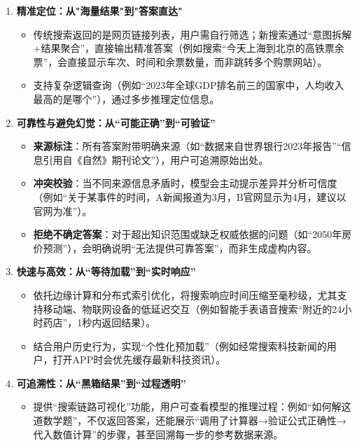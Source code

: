 \begin{enumerate}
    \item \textbf{精准定位：从"海量结果"到"答案直达"}  
    \begin{itemize}
        \item 传统搜索返回的是网页链接列表，用户需自行筛选；新搜索通过“意图拆解+结果聚合”，直接输出精准答案（例如搜索“今天上海到北京的高铁票余票”，会直接显示车次、时间和余票数量，而非跳转多个购票网站）。  
        \item 支持复杂逻辑查询（例如“2023年全球GDP排名前三的国家中，人均收入最高的是哪个”），通过多步推理定位信息。  
    \end{itemize}

    \item \textbf{可靠性与避免幻觉：从“可能正确”到“可验证”}  
    \begin{itemize}
        \item \textbf{来源标注}：所有答案附带明确来源（如“数据来自世界银行2023年报告”“信息引用自《自然》期刊论文”），用户可追溯原始出处。  
        \item \textbf{冲突校验}：当不同来源信息矛盾时，模型会主动提示差异并分析可信度（例如“关于某事件的时间，A新闻报道为3月，B官网显示为4月，建议以官网为准”）。  
        \item \textbf{拒绝不确定答案}：对于超出知识范围或缺乏权威依据的问题（如“2050年房价预测”），会明确说明“无法提供可靠答案”，而非生成虚构内容。  
    \end{itemize}

    \item \textbf{快速与高效：从“等待加载”到“实时响应”}  
    \begin{itemize}
        \item 依托边缘计算和分布式索引优化，将搜索响应时间压缩至毫秒级，尤其支持移动端、物联网设备的低延迟交互（例如智能手表语音搜索“附近的24小时药店”，1秒内返回结果）。  
        \item 结合用户历史行为，实现“个性化预加载”（例如经常搜索科技新闻的用户，打开APP时会优先缓存最新科技资讯）。  
    \end{itemize}

    \item \textbf{可追溯性：从“黑箱结果”到“过程透明”}  
    \begin{itemize}
        \item 提供“搜索链路可视化”功能，用户可查看模型的推理过程：例如“如何解这道数学题”，不仅返回答案，还能展示“调用了计算器→验证公式正确性→代入数值计算”的步骤，甚至回溯每一步的参考数据来源。  
    \end{itemize}
\end{enumerate}

